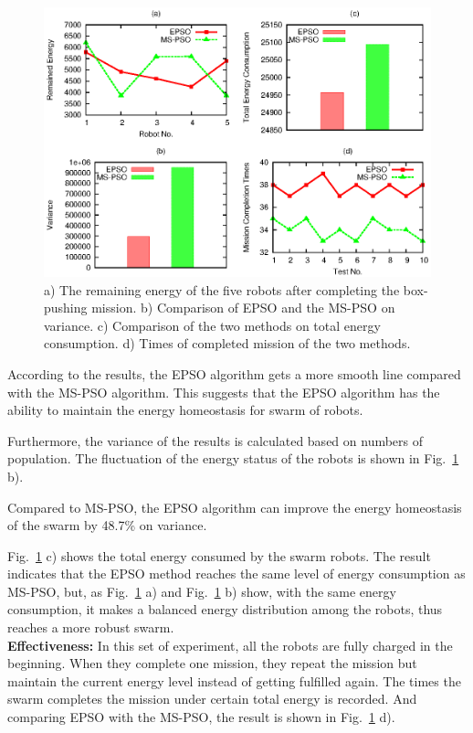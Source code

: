 \documentclass[journal]{IEEEtran}
\begin{document}
\begin{figure}[h]
\begin{center}
\includegraphics[scale=0.72]{result.eps}
%
%
\caption{a) The remaining energy of the five robots after completing the box-pushing mission. b) Comparison of EPSO and the MS-PSO on variance. c) Comparison of the two methods on total energy consumption. d) Times of completed mission of the two methods.}
\label{fig:4}       %
\end{center}
\end{figure}
According to the results, the EPSO algorithm gets a more smooth line compared with the MS-PSO algorithm. This suggests that the EPSO algorithm has the ability to maintain the energy homeostasis for swarm of robots.

Furthermore, the variance of the results is calculated based on numbers of population. The fluctuation of the energy status of the robots is shown in Fig.~\ref{fig:4} b).

Compared to MS-PSO, the EPSO algorithm can improve the energy homeostasis of the swarm by 48.7\% on variance.

Fig.~\ref{fig:4} c) shows the total energy consumed by the swarm robots. The result indicates that the EPSO method reaches the same level of energy consumption as MS-PSO, but, as Fig.~\ref{fig:4} a) and Fig.~\ref{fig:4} b) show, with the same energy consumption, it makes a balanced energy distribution among the robots, thus reaches a more robust swarm. \\
\noindent\textbf{Effectiveness:} In this set of experiment, all the robots are fully charged in the beginning. When they complete one mission, they repeat the mission but maintain the current energy level instead of getting fulfilled again. The times the swarm completes the mission under certain total energy is recorded. And comparing EPSO with the MS-PSO, the result is shown in Fig.~\ref{fig:4} d).
\end{document}
